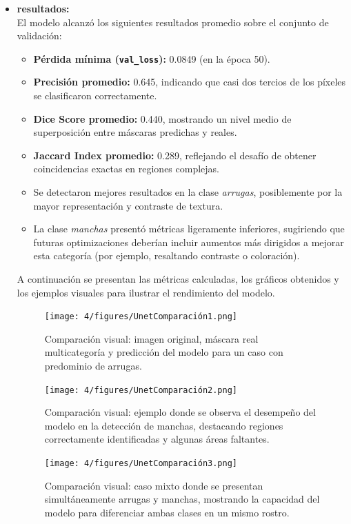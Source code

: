 \begin{itemize}
  \item \textbf{resultados:}\\
El modelo alcanzó los siguientes resultados promedio sobre el conjunto de validación:
\begin{itemize}
  \item \textbf{Pérdida mínima (\texttt{val\_loss}):} 0.0849 (en la época 50).
  \item \textbf{Precisión promedio:} 0.645, indicando que casi dos tercios de los píxeles se clasificaron correctamente.
  \item \textbf{Dice Score promedio:} 0.440, mostrando un nivel medio de superposición entre máscaras predichas y reales.
  \item \textbf{Jaccard Index promedio:} 0.289, reflejando el desafío de obtener coincidencias exactas en regiones complejas.
  \item Se detectaron mejores resultados en la clase \emph{arrugas}, posiblemente por la mayor representación y contraste de textura.
  \item La clase \emph{manchas} presentó métricas ligeramente inferiores, sugiriendo que futuras optimizaciones deberían incluir aumentos más dirigidos a mejorar esta categoría (por ejemplo, resaltando contraste o coloración).
\end{itemize}
  A continuación se presentan las métricas calculadas, los gráficos obtenidos y los ejemplos visuales para ilustrar el rendimiento del modelo.

  \vspace{0.2cm}
  \begin{figure}[H]
\centering
\texttt{[image: 4/figures/UnetComparación1.png]}
\caption{Comparación visual: imagen original, máscara real multicategoría y predicción del modelo para un caso con predominio de arrugas.}
\label{fig:validacion11}
\end{figure}

\begin{figure}[H]
\centering
\texttt{[image: 4/figures/UnetComparación2.png]}
\caption{Comparación visual: ejemplo donde se observa el desempeño del modelo en la detección de manchas, destacando regiones correctamente identificadas y algunas áreas faltantes.}
\label{fig:validacion22}
\end{figure}

\begin{figure}[H]
\centering
\texttt{[image: 4/figures/UnetComparación3.png]}
\caption{Comparación visual: caso mixto donde se presentan simultáneamente arrugas y manchas, mostrando la capacidad del modelo para diferenciar ambas clases en un mismo rostro.}
\label{fig:validacion33}
\end{figure}
\end{itemize}


